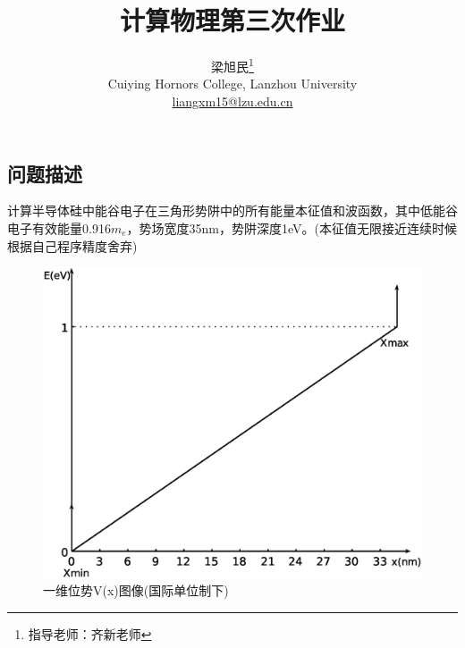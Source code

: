 \documentclass[twoside,twocolumn]{article}
\begin{document}
\begin{CJK*}{UTF8}{gkai}

\setlength{\droptitle}{-4\baselineskip} %
\pretitle{\begin{center}\Huge\bfseries} %
	\posttitle{\end{center}} %
\title{计算物理第三次作业} %
\author{
	\textsc{梁旭民}\thanks{\noindent 指导老师：齐新老师} \\[1ex] %
	\normalsize Cuiying Hornors College, Lanzhou University \\ %
	\normalsize \href{mailto:liangxm15@lzu.edu.cn}{liangxm15@lzu.edu.cn} %
}
\date{}
\renewcommand{\maketitlehookd}{
	\begin{abstract}
		本次计算物理作业主要通过打靶法求解边界为无穷高的线性势阱的一维schrodinger方程，并综合了前三章所有内容:Simpson积分、搜索法及弦切法求根、Numernov算法、打靶法。
	\end{abstract}
}
\maketitle


\section{问题描述}
计算半导体硅中能谷电子在三角形势阱中的所有能量本征值和波函数，其中低能谷电子有效能量0.916$m_{e}$，势场宽度35nm，势阱深度1eV。(本征值无限接近连续时候根据自己程序精度舍弃)
\begin{figure}[h]
	\centering
	\includegraphics[width=0.9\linewidth]{./figure/fig1}
	\caption{一维位势V(x)图像(国际单位制下)}
	\label{fig:fig1}
\end{figure}


\end{CJK*}
\end{document}

